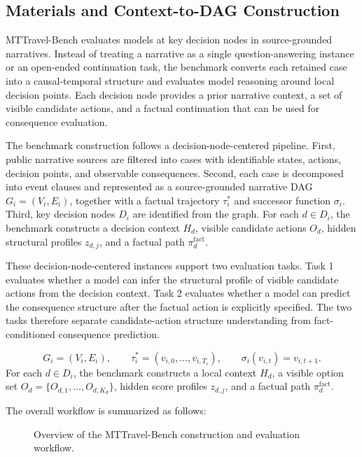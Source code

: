 \documentclass[pdflatex,sn-mathphys-num]{sn-jnl}%
\theoremstyle{thmstyleone}%
\theoremstyle{thmstyletwo}%
\theoremstyle{thmstylethree}%
\begin{document}
\subsection{Materials and Context-to-DAG Construction}
MTTravel-Bench evaluates models at key decision nodes in source-grounded narratives. Instead of treating a narrative as a single question-answering instance or an open-ended continuation task, the benchmark converts each retained case into a causal-temporal structure and evaluates model reasoning around local decision points. Each decision node provides a prior narrative context, a set of visible candidate actions, and a factual continuation that can be used for consequence evaluation.

The benchmark construction follows a decision-node-centered pipeline. First, public narrative sources are filtered into cases with identifiable states, actions, decision points, and observable consequences. Second, each case is decomposed into event clauses and represented as a source-grounded narrative DAG $G_i=(V_i,E_i)$, together with a factual trajectory $\tau_i^{*}$ and successor function $\sigma_i$. Third, key decision nodes $D_i$ are identified from the graph. For each $d\in D_i$, the benchmark constructs a decision context $H_d$, visible candidate actions $O_d$, hidden structural profiles $z_{d,j}$, and a factual path $\pi_d^{\mathrm{fact}}$.

These decision-node-centered instances support two evaluation tasks. Task 1 evaluates whether a model can infer the structural profile of visible candidate actions from the decision context. Task 2 evaluates whether a model can predict the consequence structure after the factual action is explicitly specified. The two tasks therefore separate candidate-action structure understanding from fact-conditioned consequence prediction.

\begin{equation}
G_i=(V_i,E_i),\qquad \tau_i^{*}=(v_{i,0},\ldots,v_{i,T_i}),\qquad
\sigma_i(v_{i,t})=v_{i,t+1}.
\end{equation}
For each $d\in D_i$, the benchmark constructs a local context $H_d$, a visible option set
$O_d=\{O_{d,1},\ldots,O_{d,K_d}\}$, hidden score profiles $z_{d,j}$, and a factual path
$\pi_d^{\mathrm{fact}}$.

The overall workflow is summarized as follows:

\begin{figure}[htbp]
\centering
{}
\caption{Overview of the MTTravel-Bench construction and evaluation workflow.}
\label{fig:workflow}
\end{figure}
\end{document}
